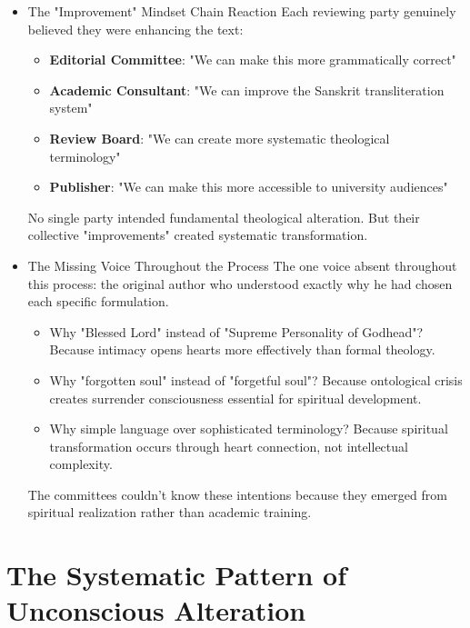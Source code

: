 \documentclass[11pt,twoside]{book}
\begin{document}
\begin{itemize}
\item The "Improvement" Mindset Chain Reaction
\label{sec:org58451a2}
Each reviewing party genuinely believed they were enhancing the text:

\begin{itemize}
\item \textbf{\textbf{Editorial Committee}}: "We can make this more grammatically correct"
\item \textbf{\textbf{Academic Consultant}}: "We can improve the Sanskrit transliteration system"
\item \textbf{\textbf{Review Board}}: "We can create more systematic theological terminology"
\item \textbf{\textbf{Publisher}}: "We can make this more accessible to university audiences"
\end{itemize}

No single party intended fundamental theological alteration. But their collective "improvements" created systematic transformation.
\item The Missing Voice Throughout the Process
\label{sec:org498f1cf}
The one voice absent throughout this process: the original author who understood exactly why he had chosen each specific formulation.

\begin{itemize}
\item Why "Blessed Lord" instead of "Supreme Personality of Godhead"? Because intimacy opens hearts more effectively than formal theology.
\item Why "forgotten soul" instead of "forgetful soul"? Because ontological crisis creates surrender consciousness essential for spiritual development.
\item Why simple language over sophisticated terminology? Because spiritual transformation occurs through heart connection, not intellectual complexity.
\end{itemize}

The committees couldn't know these intentions because they emerged from spiritual realization rather than academic training.
\end{itemize}
\section*{The Systematic Pattern of Unconscious Alteration}
\label{sec:orgc6de22d}
\end{document}
